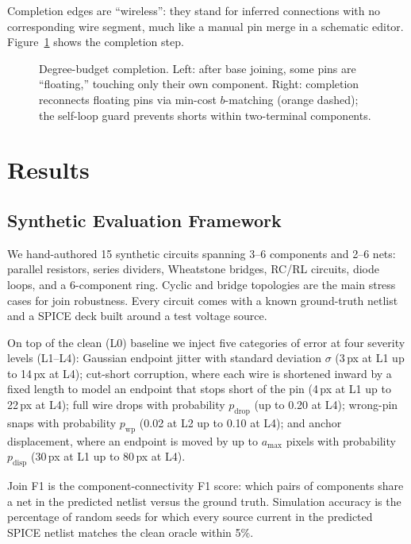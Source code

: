 \documentclass[journal]{IEEEtran}
\begin{document}
Completion edges are ``wireless'': they stand for inferred connections with no corresponding wire segment, much like a manual pin merge in a schematic editor. Figure~\ref{fig:completion} shows the completion step.

\begin{figure}[t]
\centering

\caption{Degree-budget completion. Left: after base joining, some pins are ``floating,'' touching only their own component. Right: completion reconnects floating pins via min-cost $b$-matching (orange dashed); the self-loop guard prevents shorts within two-terminal components.}
\label{fig:completion}
\end{figure}

\section{Results}

\subsection{Synthetic Evaluation Framework}

We hand-authored 15 synthetic circuits spanning 3--6 components and 2--6 nets: parallel resistors, series dividers, Wheatstone bridges, RC/RL circuits, diode loops, and a 6-component ring. Cyclic and bridge topologies are the main stress cases for join robustness. Every circuit comes with a known ground-truth netlist and a SPICE deck built around a test voltage source.

On top of the clean (L0) baseline we inject five categories of error at four severity levels (L1--L4): Gaussian endpoint jitter with standard deviation $\sigma$ (3\,px at L1 up to 14\,px at L4); cut-short corruption, where each wire is shortened inward by a fixed length to model an endpoint that stops short of the pin (4\,px at L1 up to 22\,px at L4); full wire drops with probability $p_{\text{drop}}$ (up to 0.20 at L4); wrong-pin snaps with probability $p_{\text{wp}}$ (0.02 at L2 up to 0.10 at L4); and anchor displacement, where an endpoint is moved by up to $a_{\max}$ pixels with probability $p_{\text{disp}}$ (30\,px at L1 up to 80\,px at L4).

Join F1 is the component-connectivity F1 score: which pairs of components share a net in the predicted netlist versus the ground truth. Simulation accuracy is the percentage of random seeds for which every source current in the predicted SPICE netlist matches the clean oracle within 5\%.
\end{document}
